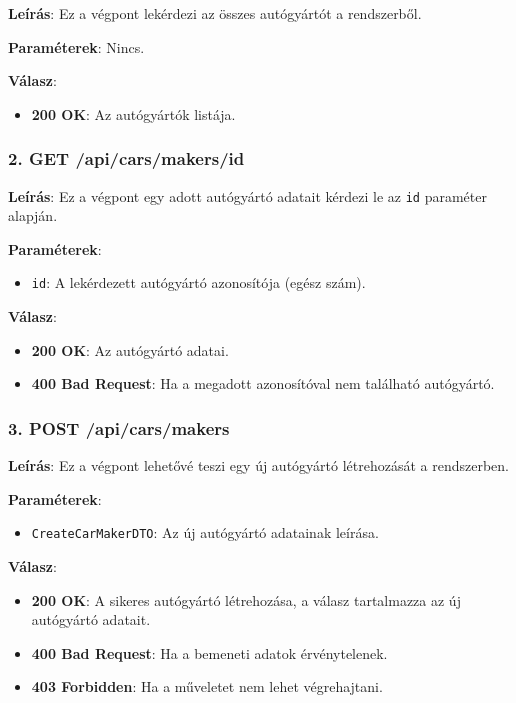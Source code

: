 \documentclass{report}[11pt]
\begin{document}
\textbf{Leírás}:  
Ez a végpont lekérdezi az összes autógyártót a rendszerből.

\textbf{Paraméterek}:  
Nincs.

\textbf{Válasz}:  
\begin{itemize}
    \item \textbf{200 OK}: Az autógyártók listája.
\end{itemize}

\subsubsection{2. GET /api/cars/makers/{id}}

\textbf{Leírás}:  
Ez a végpont egy adott autógyártó adatait kérdezi le az \texttt{id} paraméter alapján.

\textbf{Paraméterek}:  
\begin{itemize}
    \item \texttt{id}: A lekérdezett autógyártó azonosítója (egész szám).
\end{itemize}

\textbf{Válasz}:  
\begin{itemize}
    \item \textbf{200 OK}: Az autógyártó adatai.
    \item \textbf{400 Bad Request}: Ha a megadott azonosítóval nem található autógyártó.
\end{itemize}

\subsubsection{3. POST /api/cars/makers}

\textbf{Leírás}:  
Ez a végpont lehetővé teszi egy új autógyártó létrehozását a rendszerben.

\textbf{Paraméterek}:  
\begin{itemize}
    \item \texttt{CreateCarMakerDTO}: Az új autógyártó adatainak leírása.
\end{itemize}

\textbf{Válasz}:  
\begin{itemize}
    \item \textbf{200 OK}: A sikeres autógyártó létrehozása, a válasz tartalmazza az új autógyártó adatait.
    \item \textbf{400 Bad Request}: Ha a bemeneti adatok érvénytelenek.
    \item \textbf{403 Forbidden}: Ha a műveletet nem lehet végrehajtani.
\end{itemize}
\end{document}
